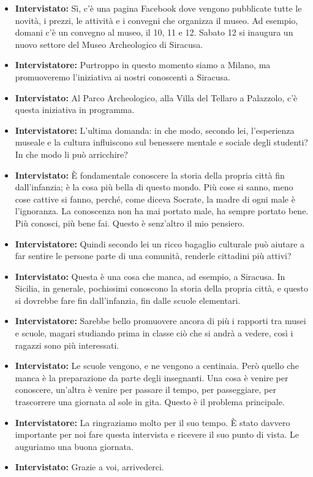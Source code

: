 \documentclass{article}
\begin{document}
\begin{itemize}
    \item \textbf{Intervistato:} Sì, c’è una pagina Facebook dove vengono pubblicate tutte le novità, i prezzi, le attività e i convegni che organizza il museo. Ad esempio, domani c’è un convegno al museo, il 10, 11 e 12. Sabato 12 si inaugura un nuovo settore del Museo Archeologico di Siracusa.
    
    \item \textbf{Intervistatore:} Purtroppo in questo momento siamo a Milano, ma promuoveremo l’iniziativa ai nostri conoscenti a Siracusa.
    
    \item \textbf{Intervistato:} Al Parco Archeologico, alla Villa del Tellaro a Palazzolo, c’è questa iniziativa in programma.
    
    \item \textbf{Intervistatore:} L’ultima domanda: in che modo, secondo lei, l’esperienza museale e la cultura influiscono sul benessere mentale e sociale degli studenti? In che modo li può arricchire?
    
    \item \textbf{Intervistato:} È fondamentale conoscere la storia della propria città fin dall’infanzia; è la cosa più bella di questo mondo. Più cose si sanno, meno cose cattive si fanno, perché, come diceva Socrate, la madre di ogni male è l’ignoranza. La conoscenza non ha mai portato male, ha sempre portato bene. Più conosci, più bene fai. Questo è senz’altro il mio pensiero.
    
    \item \textbf{Intervistatore:} Quindi secondo lei un ricco bagaglio culturale può aiutare a far sentire le persone parte di una comunità, renderle cittadini più attivi?
    
    \item \textbf{Intervistato:} Questa è una cosa che manca, ad esempio, a Siracusa. In Sicilia, in generale, pochissimi conoscono la storia della propria città, e questo si dovrebbe fare fin dall’infanzia, fin dalle scuole elementari.
    
    \item \textbf{Intervistatore:} Sarebbe bello promuovere ancora di più i rapporti tra musei e scuole, magari studiando prima in classe ciò che si andrà a vedere, così i ragazzi sono più interessati.
    
    \item \textbf{Intervistato:} Le scuole vengono, e ne vengono a centinaia. Però quello che manca è la preparazione da parte degli insegnanti. Una cosa è venire per conoscere, un’altra è venire per passare il tempo, per passeggiare, per trascorrere una giornata al sole in gita. Questo è il problema principale.
    
    \item \textbf{Intervistatore:} La ringraziamo molto per il suo tempo. È stato davvero importante per noi fare questa intervista e ricevere il suo punto di vista. Le auguriamo una buona giornata.
    
    \item \textbf{Intervistato:} Grazie a voi, arrivederci.
\end{itemize}
\end{document}
